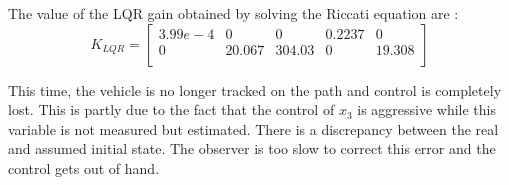 The value of the LQR gain obtained by solving the Riccati equation are :
\begin{equation}
    K_{LQR} = 
    \left[ {\begin{array}{ccccc}
         3.99e-4 &0       &0       &0.2237 &0      \\
         0         &20.067 &304.03 &0      &19.308 \\
    \end{array}}\right]
\end{equation}

This time, the vehicle is no longer tracked on the path and control is completely lost. This is partly due to the fact that the control of $x_3$ is aggressive while this variable is not measured but estimated. There is a discrepancy between the real and assumed initial state. The observer is too slow to correct this error and the control gets out of hand.

